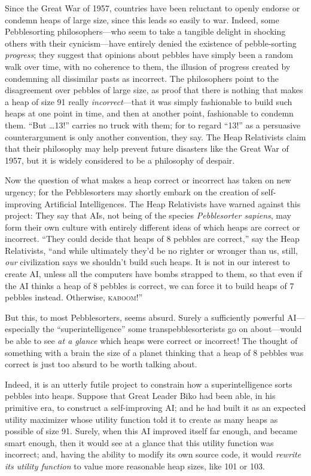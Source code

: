 {
 Since the Great War of 1957, countries have been reluctant to
openly endorse or condemn heaps of large size, since this leads so
easily to war. Indeed, some Pebblesorting philosophers---who seem to
take a tangible delight in shocking others with their cynicism---have
entirely denied the existence of pebble-sorting \textit{progress}; they
suggest that opinions about pebbles have simply been a random walk over
time, with no coherence to them, the illusion of progress created by
condemning all dissimilar pasts as incorrect. The philosophers point to
the disagreement over pebbles of large size, as proof that there is
nothing that makes a heap of size 91 really \textit{incorrect}{}---that
it was simply fashionable to build such heaps at one point in time, and
then at another point, fashionable to condemn them.
``But \ldots 13!'' carries no truck
with them; for to regard ``13!'' as
a persuasive counterargument is only another convention, they say. The
Heap Relativists claim that their philosophy may help prevent future
disasters like the Great War of 1957, but it is widely considered to be
a philosophy of despair.}

{
 Now the question of what makes a heap correct or incorrect has
taken on new urgency; for the Pebblesorters may shortly embark on the
creation of self-improving Artificial Intelligences. The Heap
Relativists have warned against this project: They say that AIs, not
being of the species \textit{Pebblesorter sapiens}, may form their own
culture with entirely different ideas of which heaps are correct or
incorrect. ``They could decide that heaps of 8 pebbles
are correct,'' say the Heap Relativists,
``and while ultimately they'd be no
righter or wronger than us, still, \textit{our} civilization says we
shouldn't build such heaps. It is not in our interest
to create AI, unless all the computers have bombs strapped to them, so
that even if the AI thinks a heap of 8 pebbles is correct, we can force
it to build heaps of 7 pebbles instead. Otherwise,
\textsc{kaboom!}''}

{
 But this, to most Pebblesorters, seems absurd. Surely a
sufficiently powerful AI---especially the
``superintelligence'' some
transpebblesorterists go on about---would be able to see \textit{at a
glance} which heaps were correct or incorrect! The thought of something
with a brain the size of a planet thinking that a heap of 8 pebbles was
correct is just too absurd to be worth talking about.}

{
 Indeed, it is an utterly futile project to constrain how a
superintelligence sorts pebbles into heaps. Suppose that Great Leader
Biko had been able, in his primitive era, to construct a self-improving
AI; and he had built it as an expected utility maximizer whose utility
function told it to create as many heaps as possible of size 91.
Surely, when this AI improved itself far enough, and became smart
enough, then it would see at a glance that this utility function was
incorrect; and, having the ability to modify its own source code, it
would \textit{rewrite its utility function} to value more reasonable
heap sizes, like 101 or 103.}

